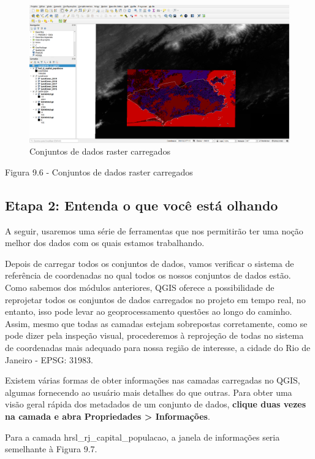 \documentclass[
]{krantz}
\begin{document}
\begin{figure}
\centering
\includegraphics{media/modulo9/fig96.png}
\caption{Conjuntos de dados raster carregados}
\end{figure}

Figura 9.6 - Conjuntos de dados raster carregados

\hypertarget{etapa-2-entenda-o-que-vocuxea-estuxe1-olhando-1}{%
\subsection{Etapa 2: Entenda o que você está olhando}\label{etapa-2-entenda-o-que-vocuxea-estuxe1-olhando-1}}

A seguir, usaremos uma série de ferramentas que nos permitirão ter uma noção melhor dos dados com os quais estamos trabalhando.

Depois de carregar todos os conjuntos de dados, vamos verificar o sistema de referência de coordenadas no qual todos os nossos conjuntos de dados estão. Como sabemos dos módulos anteriores, QGIS oferece a possibilidade de reprojetar todos os conjuntos de dados carregados no projeto em tempo real, no entanto, isso pode levar ao geoprocessamento questões ao longo do caminho. Assim, mesmo que todas as camadas estejam sobrepostas corretamente, como se pode dizer pela inspeção visual, procederemos à reprojeção de todas no sistema de coordenadas mais adequado para nossa região de interesse, a cidade do Rio de Janeiro - EPSG: 31983.

Existem várias formas de obter informações nas camadas carregadas no QGIS, algumas fornecendo ao usuário mais detalhes do que outras. Para obter uma visão geral rápida dos metadados de um conjunto de dados, \textbf{clique duas vezes na camada e abra Propriedades \textgreater{} Informações}.

Para a camada hrsl\_rj\_capital\_populacao, a janela de informações seria semelhante à Figura 9.7.
\end{document}
